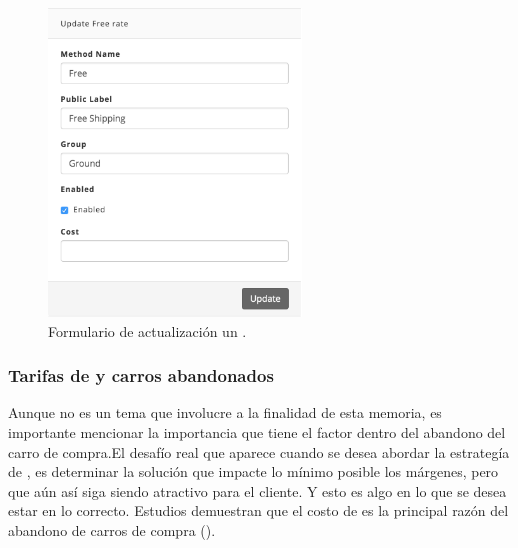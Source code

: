 \begin{figure}[H]
	\centering
	\includegraphics[width=0.6\textwidth]{figuras/dashboard/shipping/form_shipping_update.png}
	\caption{Formulario de actualización un \shippingEF.}
	\label{figure:dashboard:shipping:form_shipping_update}
\end{figure}


\subsubsection{Tarifas de \shippingEF y carros abandonados}

Aunque no es un tema que involucre a la finalidad de esta memoria, es importante mencionar la importancia que tiene el factor \shippingEF dentro del abandono del carro de compra.El desafío real que aparece cuando se desea abordar la estrategía de \shippingEF, es determinar la solución que impacte lo mínimo posible los márgenes, pero que aún así siga siendo atractivo para el cliente. Y esto es algo en lo que se desea estar en lo correcto. Estudios demuestran que el costo de \shippingEF es la principal razón del abandono de carros de compra ()\cite{online_forrester_consulting_smarter_stratefie_free_shipping}.

